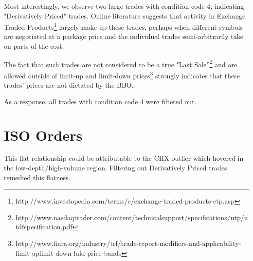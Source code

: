 \documentclass{article}
\begin{document}
Most interestingly, we observe two large trades with condition code 4, indicating "Derivatively Priced" trades. Online literature suggests that activity in Exchange Traded Products\footnote{http://www.investopedia.com/terms/e/exchange-traded-products-etp.asp} largely make up these trades, perhaps when different symbols are negotiated at a package price and the individual trades semi-arbitrarily take on parts of the cost.

The fact that such trades are not considered to be a true "Last Sale''\footnote{http://www.nasdaqtrader.com/content/technicalsupport/specifications/utp/utdfspecification.pdf} and are allowed outside of limit-up and limit-down prices\footnote{http://www.finra.org/industry/trf/trade-report-modifiers-and-applicability-limit-uplimit-down-luld-price-bands} strongly indicates that these trades' prices are not dictated by the BBO.

As a response, all trades with condition code 4 were filtered out.

\section{ISO Orders}
This flat relationship could be attributable to the CHX outlier which hovered in the low-depth/high-volume region. Filtering out Derivatively Priced trades remedied this flatness.\\
\end{document}
